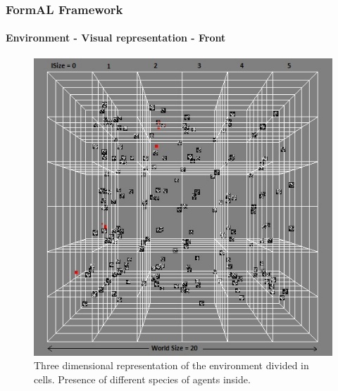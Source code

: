 \frame
{
	\frametitle{FormAL Framework}
	\framesubtitle{Environment - Visual representation - Front}

	\begin{figure}[H]
		\centering
		\includegraphics[scale=0.40]{../tex/images/cells-front}
		\caption{Three dimensional representation of the environment divided in cells. Presence of different species of agents inside.}
	\label{tab:3-d-environment-images-1}
	\end{figure}	
}

